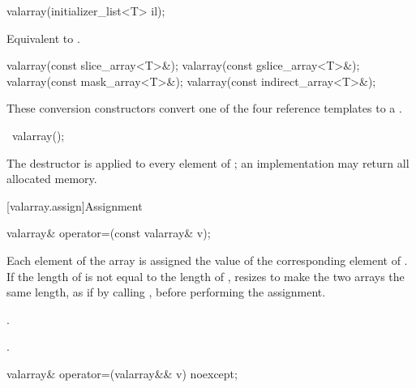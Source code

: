 %
\begin{itemdecl}
valarray(initializer_list<T> il);
\end{itemdecl}

\begin{itemdescr}
\pnum
\effects
Equivalent to .
\end{itemdescr}

%
\begin{itemdecl}
valarray(const slice_array<T>&);
valarray(const gslice_array<T>&);
valarray(const mask_array<T>&);
valarray(const indirect_array<T>&);
\end{itemdecl}

\begin{itemdescr}
\pnum
These conversion constructors convert one of the four reference templates
to a
.
\end{itemdescr}

%
\begin{itemdecl}
~valarray();
\end{itemdecl}

\begin{itemdescr}
\pnum
\effects
The destructor is applied to every element of
;
an implementation may return all allocated memory.
\end{itemdescr}

[valarray.assign]{Assignment}

%
\begin{itemdecl}
valarray& operator=(const valarray& v);
\end{itemdecl}

\begin{itemdescr}
\pnum
\effects
Each element of the
array is assigned the value of the corresponding element of .
If the length of  is not equal to the length of ,
resizes  to make the two arrays the same length,
as if by calling , before performing the assignment.

\pnum
\ensures
{}.

\pnum
\returns
{}.
\end{itemdescr}

%
\begin{itemdecl}
valarray& operator=(valarray&& v) noexcept;
\end{itemdecl}

